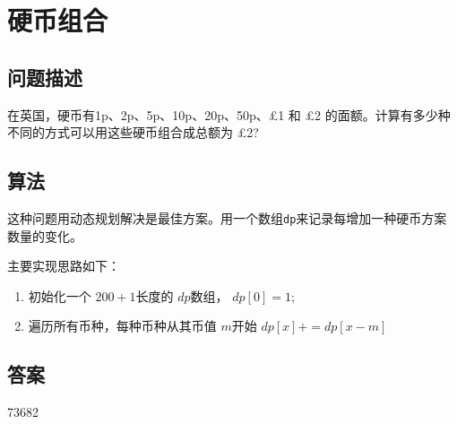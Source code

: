 \section{硬币组合}
\subsection{问题描述}
\begin{tcolorbox}

	在英国，硬币有1p、2p、5p、10p、20p、50p、£1 和 £2 的面额。计算有多少种不同的方式可以用这些硬币组合成总额为 £2?
\end{tcolorbox}

\subsection{算法}
这种问题用动态规划解决是最佳方案。用一个数组\texttt{dp}来记录每增加一种硬币方案数量的变化。

主要实现思路如下：
\begin{enumerate}
	\item 初始化一个 \( 200 + 1 \)长度的 \( dp \)数组， \( dp[0] = 1 \);
	\item 遍历所有币种，每种币种从其币值 \( m \)开始 \( dp[x] += dp[x - m] \)
\end{enumerate}

\subsection{答案}
73682

